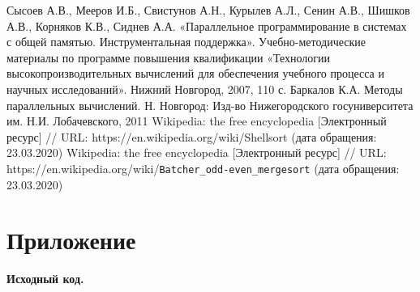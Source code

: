 \documentclass{report}
\begin{document}
\begin{thebibliography}{1}
 Сысоев А.В., Мееров И.Б., Свистунов А.Н., Курылев А.Л., Сенин А.В., Шишков А.В., Корняков К.В., Сиднев А.А. «Параллельное программирование в системах с общей памятью. Инструментальная поддержка». Учебно-методические материалы по программе повышения квалификации «Технологии высокопроизводительных вычислений для обеспечения учебного процесса и научных исследований». Нижний Новгород, 2007, 110 с. 
 Баркалов К.А. Методы параллельных вычислений. Н. Новгород: Изд-во Нижегородского госуниверситета им. Н.И. Лобачевского, 2011
 Wikipedia: the free encyclopedia [Электронный ресурс] // URL: https://en.wikipedia.org/wiki/Shellsort (дата обращения: 23.03.2020)
 Wikipedia: the free encyclopedia [Электронный ресурс] // URL: https://en.wikipedia.org/wiki/\verb|Batcher_odd-even_mergesort| (дата обращения: 23.03.2020)
\end{thebibliography}
\newpage

\section*{Приложение}
\centerline{\bfseries Исходный код.} 
















\end{document}
